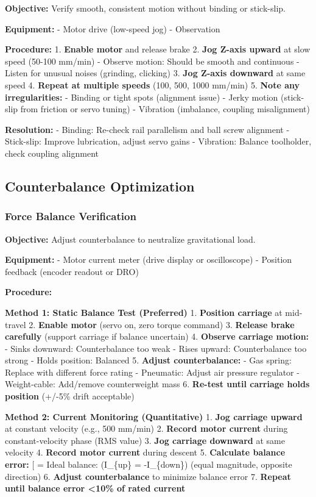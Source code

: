 \documentclass[
]{article}
\begin{document}
\textbf{Objective:} Verify smooth, consistent motion without binding or
stick-slip.

\textbf{Equipment:} - Motor drive (low-speed jog) - Observation

\textbf{Procedure:} 1. \textbf{Enable motor} and release brake 2.
\textbf{Jog Z-axis upward} at slow speed (50-100 mm/min) - Observe
motion: Should be smooth and continuous - Listen for unusual noises
(grinding, clicking) 3. \textbf{Jog Z-axis downward} at same speed 4.
\textbf{Repeat at multiple speeds} (100, 500, 1000 mm/min) 5.
\textbf{Note any irregularities:} - Binding or tight spots (alignment
issue) - Jerky motion (stick-slip from friction or servo tuning) -
Vibration (imbalance, coupling misalignment)

\textbf{Resolution:} - Binding: Re-check rail parallelism and ball screw
alignment - Stick-slip: Improve lubrication, adjust servo gains -
Vibration: Balance toolholder, check coupling alignment

\subsection{Counterbalance
Optimization}\label{counterbalance-optimization}

\subsubsection{Force Balance
Verification}\label{force-balance-verification}

\textbf{Objective:} Adjust counterbalance to neutralize gravitational
load.

\textbf{Equipment:} - Motor current meter (drive display or
oscilloscope) - Position feedback (encoder readout or DRO)

\textbf{Procedure:}

\textbf{Method 1: Static Balance Test (Preferred)} 1. \textbf{Position
carriage} at mid-travel 2. \textbf{Enable motor} (servo on, zero torque
command) 3. \textbf{Release brake carefully} (support carriage if
balance uncertain) 4. \textbf{Observe carriage motion:} - Sinks
downward: Counterbalance too weak - Rises upward: Counterbalance too
strong - Holds position: Balanced 5. \textbf{Adjust counterbalance:} -
Gas spring: Replace with different force rating - Pneumatic: Adjust air
pressure regulator - Weight-cable: Add/remove counterweight mass 6.
\textbf{Re-test until carriage holds position} (+/-5\% drift acceptable)

\textbf{Method 2: Current Monitoring (Quantitative)} 1. \textbf{Jog
carriage upward} at constant velocity (e.g., 500 mm/min) 2.
\textbf{Record motor current} during constant-velocity phase (RMS value)
3. \textbf{Jog carriage downward} at same velocity 4. \textbf{Record
motor current} during descent 5. \textbf{Calculate balance error:}
{[} = \frac{I_{up} + I_{down}}{2}{]} Ideal balance:
(I\_\{up\} = -I\_\{down\}) (equal magnitude, opposite direction) 6.
\textbf{Adjust counterbalance} to minimize balance error 7.
\textbf{Repeat until balance error \textless10\% of rated current}
\end{document}

